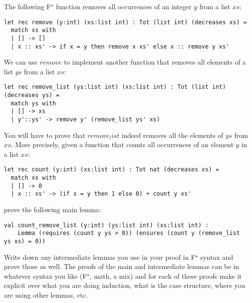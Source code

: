 \documentclass[a4paper,11pt]{article}
\newcommand\fstar{F$^\star$\xspace}
\begin{document}
The following \fstar{} function removes all occurrences of
an integer \ls$y$ from a list \ls$xs$:
\begin{lstlisting}
let rec remove (y:int) (xs:list int) : Tot (list int) (decreases xs) =
  match xs with
  | [] -> []
  | x :: xs' -> if x = y then remove x xs' else x :: remove y xs'
\end{lstlisting}
%
We can use \ls$remove$ to implement another function that removes all
elements of a list \ls$ys$ from a list \ls$xs$:
\begin{lstlisting}
let rec remove_list (ys:list int) (xs:list int) : Tot (list int) (decreases ys) =
  match ys with
  | [] -> xs
  | y'::ys' -> remove y' (remove_list ys' xs)
\end{lstlisting}
%
You will have to prove that \ls$remove_list$ indeed removes all the
elements of \ls$ys$ from \ls$xs$. More precisely, given a
function that counts all occurrences of an element \ls$y$ in a list \ls$xs$:
%
\begin{lstlisting}
let rec count (y:int) (xs:list int) : Tot nat (decreases xs) =
  match xs with
  | [] -> 0
  | x :: xs' -> (if x = y then 1 else 0) + count y xs'
\end{lstlisting}
%
prove the following main lemma:
\begin{lstlisting}
val count_remove_list (y:int) (ys:list int) (xs:list int) :
    Lemma (requires (count y ys > 0)) (ensures (count y (remove_list ys xs) = 0))
\end{lstlisting}
%
Write down any intermediate lemmas you use in your proof in \fstar{}
syntax and prove those as well.
%
The proofs of the main and intermediate lemmas can be in whatever
syntax you like (\fstar{}, math, a mix) and for each of these proofs
make it explicit over what you are doing induction, what is the case
structure, where you are using other lemmas, etc.
\end{document}
